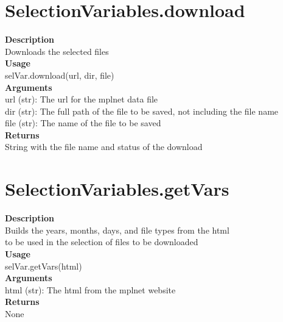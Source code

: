 \documentclass[11pt, oneside]{article}
\begin{document}

\section{SelectionVariables.download}

\textbf{Description} \\
        Downloads the selected files\\

\noindent\textbf{Usage} \\
        selVar.download(url, dir, file) \\

\noindent\textbf{Arguments} \\
        url (str): The url for the mplnet data file\\
        dir (str): The full path of the file to be saved, not including the file name\\
        file (str): The name of the file to be saved\\

\noindent\textbf{Returns} \\
        String with the file name and status of the download\\


\section{SelectionVariables.getVars}

\textbf{Description} \\
        Builds the years, months, days, and file types from the html\\
        to be used in the selection of files to be downloaded\\

\noindent\textbf{Usage} \\
        selVar.getVars(html) \\

\noindent\textbf{Arguments} \\
        html (str): The html from the mplnet website\\

\noindent\textbf{Returns} \\
        None \\
\end{document}
